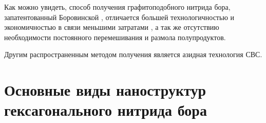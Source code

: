 Как можно увидеть, способ получения графитоподобного нитрида бора,
запатентованный Боровинской \cite[]{__1999}, отличается большей технологичностью
и экономичностью в связи меньшими затратами , а так же отсутствию необходимости
постоянного перемешивания и размола полупродуктов.

Другим распространенным методом получения является азидная технология СВС.



%








\section{Основные виды наноструктур гексагонального нитрида бора}%
\label{sec:Основные виды наноструктур гексагонального нитрида бора}

